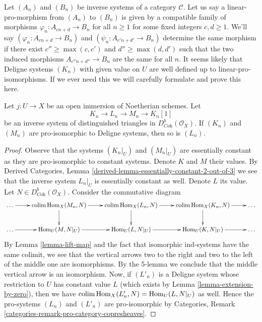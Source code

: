 \begin{remark}
\label{remark-extension-by-zero-linear-pro-system}
Let $(A_n)$ and $(B_n)$ be inverse systems of a category $\mathcal{C}$.
Let us say a linear-pro-morphism from $(A_n)$ to $(B_n)$ is given
by a compatible family of morphisms $\varphi_n : A_{cn + d} \to B_n$
for all $n \geq 1$ for some fixed integers $c, d \geq 1$.
We'll say $(\varphi_n : A_{cn + d} \to B_n)$ and
$(\psi_n : A_{c'n + d'} \to B_n)$ determine the same morphism
if there exist $c'' \geq \max(c, c')$ and $d'' \geq \max(d, d')$
such that the two induced morphisms $A_{c'' n + d''} \to B_n$ are the same
for all $n$. It seems likely that Deligne systems $(K_n)$ with given value on
$U$ are well defined up to linear-pro-isomorphisms. If we ever need this
we will carefully formulate and prove this here.
\end{remark}

\begin{lemma}
\label{lemma-deligne-system-2-out-of-3}
Let $j : U \to X$ be an open immersion of Noetherian schemes.
Let
$$
K_n \to L_n \to M_n \to K_n[1]
$$
be an inverse system of distinguished triangles in
$D^b_{\textit{Coh}}(\mathcal{O}_X)$. If $(K_n)$ and $(M_n)$
are pro-isomorphic to Deligne systems, then so is $(L_n)$.
\end{lemma}

\begin{proof}
Observe that the systems $(K_n|_U)$ and $(M_n|_U)$ are essentially constant
as they are pro-isomorphic to constant systems.
Denote $K$ and $M$ their values. By Derived Categories, Lemma
\ref{derived-lemma-essentially-constant-2-out-of-3}
we see that the inverse system $L_n|_U$ is essentially constant as well.
Denote $L$ its value.
Let $N \in D^b_{\textit{Coh}}(\mathcal{O}_X)$. Consider the commutative
diagram
$$
\xymatrix{
\ldots \ar[r] &
\colim \Hom_X(M_n, N) \ar[r] \ar[d] &
\colim \Hom_X(L_n, N) \ar[r] \ar[d] &
\colim \Hom_X(K_n, N) \ar[r] \ar[d] &
\ldots \\
\ldots \ar[r] &
\Hom_U(M, N|_U) \ar[r] &
\Hom_U(L, N|_U) \ar[r] &
\Hom_U(K, N|_U) \ar[r] &
\ldots
}
$$
By Lemma \ref{lemma-lift-map} and the fact that isomorphic ind-systems
have the same colimit, we see that the vertical arrows two to the right
and two to the left of the middle one are isomorphisms. By the 5-lemma
we conclude that the
middle vertical arrow is an isomorphism. Now, if $(L'_n)$ is a Deligne system
whose restriction to $U$ has constant value $L$ (which
exists by Lemma \ref{lemma-extension-by-zero}), then
we have $\mathop{\mathrm{colim}}\nolimits \mathop{\mathrm{Hom}}\nolimits_X(L'_n, N) = \mathop{\mathrm{Hom}}\nolimits_U(L, N|_U)$ as well.
Hence the pro-systems $(L_n)$ and $(L'_n)$ are
pro-isomorphic by
Categories, Remark \ref{categories-remark-pro-category-copresheaves}.
\end{proof}

